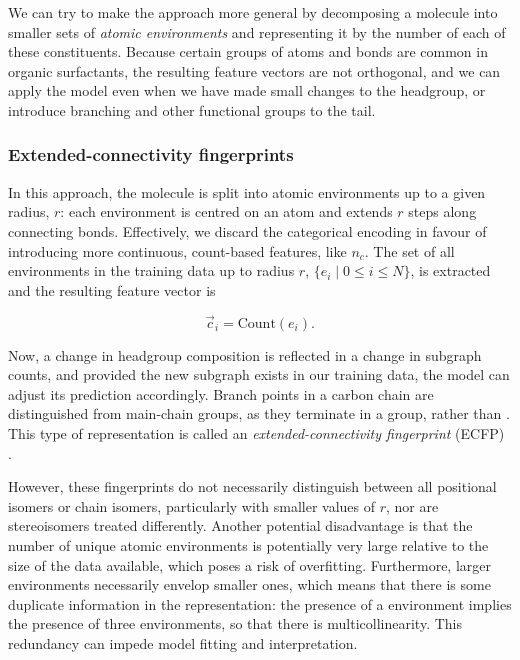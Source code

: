 We can try to make the approach more general by decomposing a molecule into
smaller sets of \emph{atomic environments} and representing it by the number of
each of these constituents. Because certain groups of atoms and bonds are common
in organic surfactants, the resulting feature vectors are not orthogonal, and we
can apply the model even when we have made small changes to the headgroup, or
introduce branching and other functional groups to the tail.

\subsubsection{Extended-connectivity fingerprints}

In this approach, the molecule is split into atomic environments up to a given
radius, $r$: each environment is centred on an atom and extends $r$ steps along
connecting bonds. Effectively, we discard the categorical encoding in favour of
introducing more continuous, count-based features, like $n_c$. The set of all
environments in the training data up to radius $r$, $\{e_i \mid 0 \leq i \leq
    N\}$, is extracted and the resulting feature vector is

\begin{equation}
    \label{eq:ecfp}
    \vec{c}_i = \text{Count}(e_i).
\end{equation}

Now, a change in headgroup composition is reflected in a change in subgraph
counts, and provided the new subgraph exists in our training data, the model can
adjust its prediction accordingly. Branch points in a carbon chain are
distinguished from main-chain groups, as they terminate in a  group,
rather than . This type of representation is called an
\emph{extended-connectivity fingerprint} (ECFP)
\cite{rogersExtendedConnectivityFingerprints2010}.

However, these fingerprints do not necessarily distinguish between all
positional isomers or chain isomers, particularly with smaller values of $r$,
nor are stereoisomers treated differently. Another potential disadvantage is
that the number of unique atomic environments is potentially very large relative
to the size of the data available, which poses a risk of overfitting.
Furthermore, larger environments necessarily envelop smaller ones, which means
that there is some duplicate information in the representation: the presence of
a  environment implies the presence of three  environments,
so that there is multicollinearity. This redundancy can impede model fitting and
interpretation.

